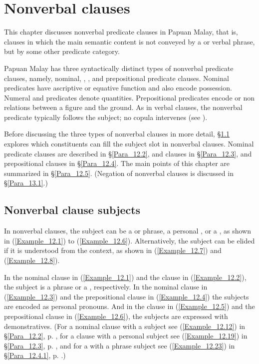 \chapter[Nonverbal clauses]{Nonverbal clauses}
\label{Para_12}
This chapter discusses nonverbal predicate clauses in Papuan Malay, that is, clauses in which the main semantic content is not conveyed by a  or verbal phrase, but by some other predicate category.



Papuan Malay has three syntactically distinct types of nonverbal predicate clauses, namely, nominal, , , and prepositional predicate  clauses. Nominal predicates have ascriptive or equative function and also encode possession. Numeral and  predicates denote quantities. Prepositional predicates encode  or non relations between a figure and the ground. As in verbal clauses, the nonverbal predicate typically follows the subject; no copula intervenes (see ).



Before discussing the three types of nonverbal clauses in more detail, §\ref{Para_12.1} explores which constituents can fill the subject slot in nonverbal clauses. Nominal predicate clauses are described in §\ref{Para_12.2},  and  clauses in §\ref{Para_12.3}, and prepositional clauses in §\ref{Para_12.4}. The main points of this chapter are summarized in §\ref{Para_12.5}. (Negation of nonverbal clauses is discussed in §\ref{Para_13.1}.)


\section{Non{verbal clause} subjects}
\label{Para_12.1}
In nonverbal clauses, the subject can be a  or  phrase, a personal , or a , as shown in (\ref{Example_12.1}) to (\ref{Example_12.6}). Alternatively, the subject can be elided if it is understood from the context, as shown in (\ref{Example_12.7}) and (\ref{Example_12.8}).



In the nominal clause in (\ref{Example_12.1}) and the  clause in (\ref{Example_12.2}), the subject is a  phrase or a , respectively. In the nominal clause in (\ref{Example_12.3}) and the prepositional clause in (\ref{Example_12.4}) the subjects are encoded as personal pronouns. And in the  clause in (\ref{Example_12.5}) and the prepositional clause in (\ref{Example_12.6}), the subjects are expressed with demonstratives. (For a nominal clause with a  subject see (\ref{Example_12.12}) in §\ref{Para_12.2}, p. \pageref{Example_12.12}, for a  clause with a personal  subject see (\ref{Example_12.19}) in §\ref{Para_12.3}, p. \pageref{Example_12.19}, and for a  with a  phrase subject see (\ref{Example_12.23}) in §\ref{Para_12.4.1}, p. \pageref{Example_12.23}.)


